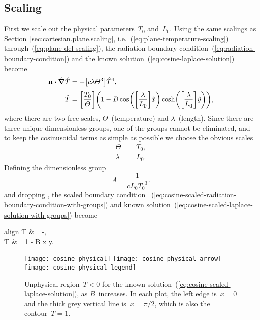 \subsection{Scaling}
\label{sec:cartesian.cosine.scaling}

First we scale out the physical parameters~$T_0$ and~$L_0$.
Using the same scalings as Section~\ref{sec:cartesian.plane.scaling},
i.e.~(\ref{eq:plane-temperature-scaling}) through~(\ref{eq:plane-del-scaling}),
the radiation boundary condition~(\ref{eq:radiation-boundary-condition})
and the known solution~(\ref{eq:cosine-laplace-solution})
become
\begin{align}
  \normalvec \dotp \scaleddel \scaled{T}
    &= -\group{c \lambda \Theta^3} \scaled{T}^4,
    \label{eq:cosine-scaled-radiation-boundary-condition-with-groups}
    \\[\tallspace]
  \scaled{T}
    &=
      \group{\frac{T_0}{\Theta}}
      \roundbr*{
        1 -
          B
          \cos \roundbr*{\group{\frac{\lambda}{L_0}} \scaled{x}}
          \cosh \roundbr*{\group{\frac{\lambda}{L_0}} \scaled{y}}
      },
    \label{eq:cosine-scaled-laplace-solution-with-groups}
\end{align}
where there are two free scales, $\Theta$~(temperature) and $\lambda$~(length).
Since there are three unique dimensionless groups,
one of the groups cannot be eliminated,
and to keep the cosinusoidal terms as simple as possible
we choose the obvious scales
\begin{align}
  \Theta &= T_0,
    \label{eq:cosine-temperature-scale} \\
  \lambda &= L_0.
    \label{eq:cosine-length-scale}
\end{align}
Defining the dimensionless group
\begin{equation}
  A = \frac{1}{c L_0 {T_0}^3}.
  \label{eq:cosine-dimensionless-group}
\end{equation}
and dropping \scalingmarks,
the scaled boundary condition~%
  (\ref{eq:cosine-scaled-radiation-boundary-condition-with-groups})
and known solution~(\ref{eq:cosine-scaled-laplace-solution-with-groups})
become
\begin{important}{align}
  \normalvec \dotp \del T &= -,
    \label{eq:cosine-scaled-radiation-boundary-condition} \\[\tallspace]
  T &= 1 - B \cos x \cosh y.
    \label{eq:cosine-scaled-laplace-solution}
\end{important}

\begin{figure}
  \centering
  \texttt{[image: cosine-physical]}
  \texttt{[image: cosine-physical-arrow]}
  \texttt{[image: cosine-physical-legend]}
  \caption{
    Unphysical region~$T < 0$
    for the known solution~(\ref{eq:cosine-scaled-laplace-solution}),
    as $B$~increases.
    In each plot, the left edge is~$x = 0$
    and the thick grey vertical line is~$x = \pi/2$,
    which is also the contour~$T = 1$.
  }
  \label{fig:cosine-physical}
\end{figure}


